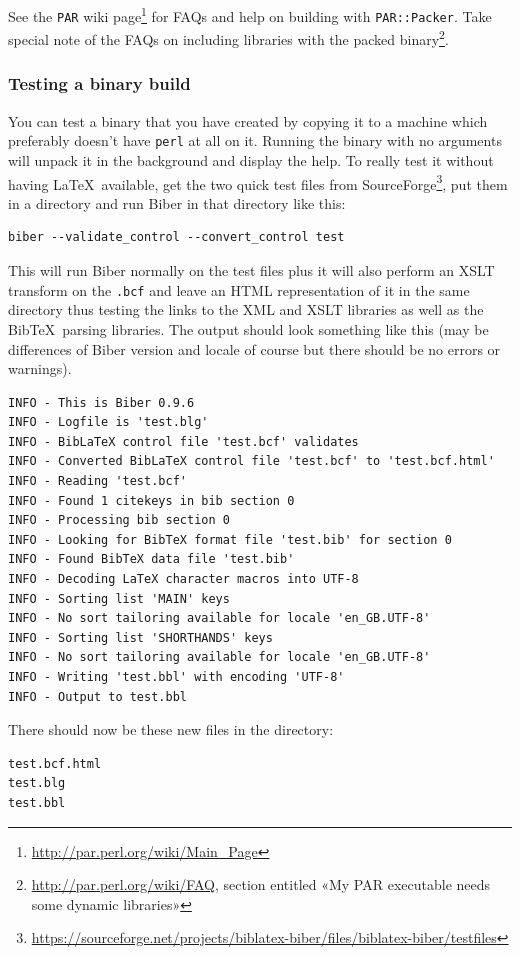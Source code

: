 \documentclass{ltxdockit}
\begin{document}
See the \verb+PAR+ wiki
page\footnote{\url{http://par.perl.org/wiki/Main_Page}} for FAQs and help
on building with \verb+PAR::Packer+. Take special note of the FAQs on
including libraries with the packed
binary\footnote{\url{http://par.perl.org/wiki/FAQ}, section entitled «My
  PAR executable needs some dynamic libraries»}.

\subsubsection{Testing a binary build}
You can test a binary that you have created by copying it to a machine
which preferably doesn't have \verb+perl+ at all on it. Running the binary with no
arguments will unpack it in the background and display the help. To really
test it without having \LaTeX\ available, get the two quick test files from
SourceForge\footnote{\url{https://sourceforge.net/projects/biblatex-biber/files/biblatex-biber/testfiles}},
put them in a directory and run Biber in that directory like this:

\begin{verbatim}
biber --validate_control --convert_control test
\end{verbatim}

\noindent This will run Biber normally on the test files plus it
will also perform an XSLT transform on the \verb+.bcf+ and
leave an HTML representation of it in the same directory thus testing the
links to the XML and XSLT libraries as well as the Bib\TeX\ parsing
libraries. The output should look something like this (may be differences
of Biber version and locale of course but there should be no errors
or warnings).

\begin{verbatim}
INFO - This is Biber 0.9.6
INFO - Logfile is 'test.blg'
INFO - BibLaTeX control file 'test.bcf' validates
INFO - Converted BibLaTeX control file 'test.bcf' to 'test.bcf.html'
INFO - Reading 'test.bcf'
INFO - Found 1 citekeys in bib section 0
INFO - Processing bib section 0
INFO - Looking for BibTeX format file 'test.bib' for section 0
INFO - Found BibTeX data file 'test.bib'
INFO - Decoding LaTeX character macros into UTF-8
INFO - Sorting list 'MAIN' keys
INFO - No sort tailoring available for locale 'en_GB.UTF-8'
INFO - Sorting list 'SHORTHANDS' keys
INFO - No sort tailoring available for locale 'en_GB.UTF-8'
INFO - Writing 'test.bbl' with encoding 'UTF-8'
INFO - Output to test.bbl
\end{verbatim}

\noindent There should now be these new files in the directory:

\begin{verbatim}
test.bcf.html
test.blg
test.bbl
\end{verbatim}
\end{document}
